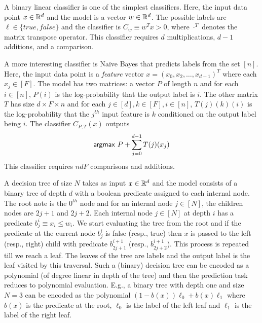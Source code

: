 A binary linear classifier is one of the simplest classifiers. Here, the input data point $x\in{\mathbb{R}}^d$
and the model is a vector $w\in{\mathbb{R}}^d$. The possible labels are $\ell\in\{\mathit{true},\mathit{false}\}$
and the classifier is $C_w\equiv w^Tx>0$, where $\cdot^T$ denotes the matrix transpose operator.
This classifier requires $d$ multiplications, $d-1$ additions, and a comparison.

A more interesting classifier is Na\"{i}ve Bayes that predicts labels from the set $[n]$.
Here, the input data point is a {\it feature}
vector $x=(x_0,x_2,\ldots,x_{d-1})^T$ where each $x_j\in [F]$.
The model has two matrices: a vector $P$ of length $n$ and for each $i \in [n]$, $P(i)$ is the log-probability that the output label is $i$.
The other matrix $T$ has size $d\times F\times n$ and for each $j\in [d], k\in [F], i\in [n]$, $T(j)(k)(i)$ is
the log-probability that  the $j^{th}$ input feature is $k$  conditioned on  the output label being $i$.
The classifier $C_{P,T}(x)$ outputs
\[
{\sf argmax}\ P+\sum_{j=0}^{d-1} T(j)(x_j)
\]
This classifier requires $ndF$ comparisons and additions.  

A decision tree of size $N$ takes as input $x\in{\mathbb{R}}^d$ and the model consists of a binary tree of depth $d$ with a boolean predicate
assigned to each internal node. The root note is the $0^{th}$ node and for an internal node $j \in [N]$, the children nodes are $2j+1$ and $2j+2$. Each internal node $j\in[N]$ at depth $i$ has a predicate $b_{j}^i\equiv x_i\leq w_i$. We start evaluating the tree from the root and if the predicate at the current node $b_j^i$ is false (resp., true) then $x$ is passed to the left (resp., right) child with predicate $b_{2j+1}^{i+1}$ (resp., $b_{2j+2}^{i+1}$). This process is repeated till we reach a leaf. The leaves of the tree are labels and the output label is the leaf visited by this traversal.
Such a (binary) decision tree can be encoded as a polynomial (of degree linear in depth of the tree) and then the prediction task
reduces to polynomial evaluation. E.g., a binary tree with depth one and size $N=3$ can be encoded as the polynomial
$(1-b(x))\ell_0 + b(x)\ell_1$ where $b(x)$ is the predicate at the root, $\ell_0$ is the label of the left leaf and $\ell_1$ is the label of the right leaf.

